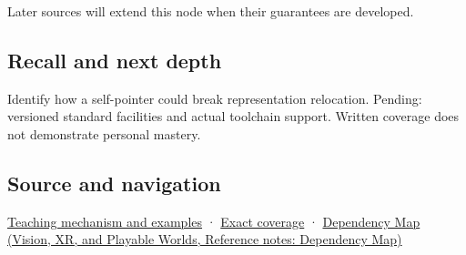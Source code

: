 \hypertarget{appendix-adfd6397af8d-used-by}{}

Later sources will extend this node when their guarantees are developed.

\subsection{Recall and next depth}\label{appendix-adfd6397af8d-recall-and-next-depth}

\hypertarget{appendix-adfd6397af8d-recall-and-next-depth}{}

Identify how a self-pointer could break representation relocation. Pending: versioned standard facilities and actual toolchain support. Written coverage does not demonstrate personal mastery.

\subsection{Source and navigation}\label{appendix-adfd6397af8d-source-and-navigation}

\hypertarget{appendix-adfd6397af8d-source-and-navigation}{}

\hyperref[01-foundations-i-ch003-from-three-repairs-to-five-decisions-to-zero-boilerplate]{Teaching mechanism and examples} · \hyperref[appendix-fd090d982a15-m009---parts-127-147]{Exact coverage} · \href{../07-Vision-XR-and-Playable-Worlds/main.pdf\#nameddest=appendix-4ad47bdd269a}{Dependency Map (Vision, XR, and Playable Worlds, Reference notes: Dependency Map)}

